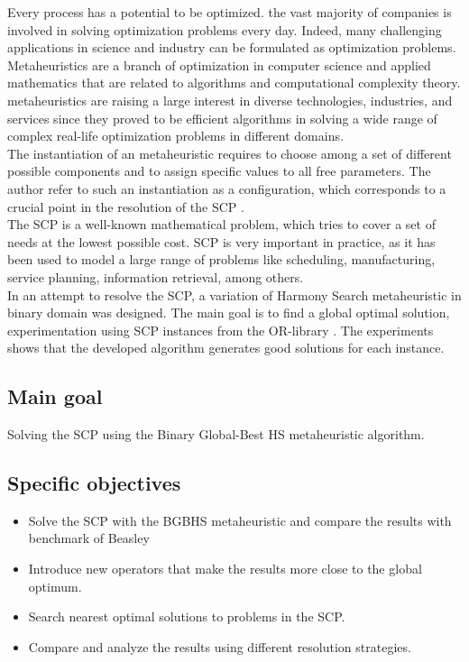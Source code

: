 Every process has a potential to be optimized. the vast majority of companies is involved in solving optimization problems every day. Indeed, many challenging applications in science and industry can be formulated as optimization problems.\\

Metaheuristics are a branch of optimization in computer science and applied mathematics that are related to algorithms and computational complexity theory. metaheuristics are raising a large interest in diverse technologies, industries, and services since they proved to be efficient algorithms in solving a wide range of  complex real-life optimization problems in different domains.\\

The instantiation of an metaheuristic requires to choose among a set of different possible components and to assign specific values to all free parameters. The author refer to such an instantiation as a configuration, which corresponds to a crucial point in the resolution of the SCP \cite{DBLP:conf/gecco/BirattariSPV02}.\\

The SCP is a well-known mathematical problem, which tries to cover a set of needs at the lowest possible cost. SCP is very important in practice, as it has been used to model a large range of problems like scheduling, manufacturing, service planning, information retrieval, among others.\\

In an attempt to resolve the SCP, a variation of Harmony Search metaheuristic in binary domain  was designed. The main goal is to find a global optimal solution, experimentation using SCP instances from the OR-library \cite{citeulike:921349}. The experiments shows that the developed algorithm generates good solutions for each instance.

\subsection{Main goal}
Solving the SCP using the Binary Global-Best HS metaheuristic algorithm.

\subsection{Specific objectives}
\begin{itemize}
\item Solve the SCP with the BGBHS metaheuristic and compare the results with benchmark of Beasley	
\item Introduce new operators that make the results more close to the global optimum.
\item Search nearest optimal solutions to problems in the SCP.
\item Compare and analyze the results using different resolution strategies.
\end{itemize}



